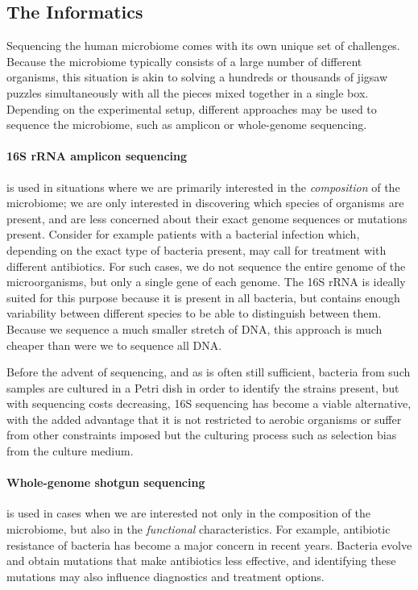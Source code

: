 \begin{justify}
\subsection{The Informatics}

Sequencing the human microbiome comes with its own unique set of challenges. Because the microbiome typically consists of a large number of different organisms, this situation is akin to solving a hundreds or thousands of jigsaw puzzles simultaneously with all the pieces mixed together in a single box. Depending on the experimental setup, different approaches may be used to sequence the microbiome, such as amplicon or whole-genome sequencing.

\paragraph{16S rRNA amplicon sequencing} is used in situations where we are primarily interested in the \emph{composition} of the microbiome; we are only interested in discovering which species of organisms are present, and are less concerned about their exact genome sequences or mutations present. Consider for example patients with a bacterial infection which, depending on the exact type of bacteria present, may call for treatment with different antibiotics. For such cases, we do not sequence the entire genome of the microorganisms, but only a single gene of each genome. The 16S rRNA is ideally suited for this purpose because it is present in all bacteria, but contains enough variability between different species to be able to distinguish between them. Because we sequence a much smaller stretch of DNA, this approach is much cheaper than were we to sequence all DNA.

Before the advent of sequencing, and as is often still sufficient, bacteria from such samples are cultured in a Petri dish in order to identify the strains present, but with sequencing costs decreasing, 16S sequencing has become a viable alternative, with the added advantage that it is not restricted to aerobic organisms or suffer from other constraints imposed but the culturing process such as selection bias from the culture medium.

\paragraph{Whole-genome shotgun sequencing} is used in cases when we are interested not only in the composition of the microbiome, but also in the \emph{functional} characteristics. For example, antibiotic resistance of bacteria has become a major concern in recent years. Bacteria evolve and obtain mutations that make antibiotics less effective, and identifying these mutations may also influence diagnostics and treatment options.



\end{justify}

